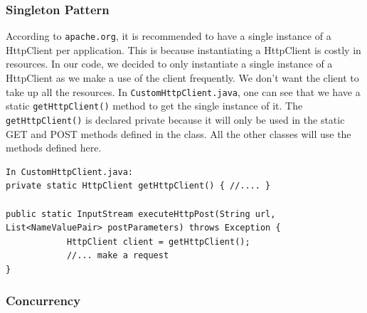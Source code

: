 \documentclass[a4paper,11pt]{article}
\begin{document}
\subsubsection*{Singleton Pattern}

According to \texttt{apache.org}, it is recommended to have a single instance of a HttpClient per application. This is because instantiating a HttpClient is costly in resources. In our code, we decided to only instantiate a single instance of a HttpClient as we make a use of the client frequently. We don't want the client to take up all the resources. In \texttt{CustomHttpClient.java}, one can see that we have a static \texttt{getHttpClient()} method to get the single instance of it. The \texttt{getHttpClient()} is declared private because it will only be used in the static GET and POST methods defined in the class. All the other classes will use the methods defined here. 

\begin{verbatim}
In CustomHttpClient.java:
private static HttpClient getHttpClient() { //.... }

public static InputStream executeHttpPost(String url, 
List<NameValuePair> postParameters) throws Exception {
            HttpClient client = getHttpClient();
            //... make a request
}  
\end{verbatim} 

\subsubsection*{Concurrency}
\end{document}
